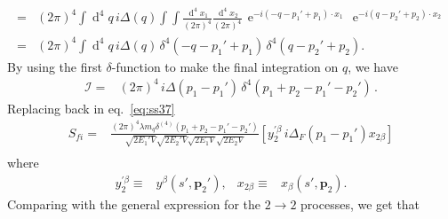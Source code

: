\begin{align}
  =& \left( 2\pi \right)^4 \int {\operatorname{d}^4q}\, i \Delta(q)
\int\int \frac{\operatorname{d}^4x_1}{\left( 2\pi \right)^4} \frac{\operatorname{d}^4x_2}{\left( 2\pi \right)^4} 
\, \operatorname{e}^{-i(-q-p_1'+p_1)\cdot x_1}   
\, \operatorname{e}^{-i(q-p_2'+p_2)\cdot x_2}   \nonumber\\
 =& \left( 2\pi \right)^4 \int {\operatorname{d}^4q}\, i \Delta(q)
\, \delta^{4}(-q-p_1'+p_1)   
\, \delta^4(q-p_2'+p_2).
\end{align}
By using the first  $\delta$-function to make the final integration on $q$, we have
\begin{align}
  \mathcal{I} =& \left( 2\pi \right)^4 \, i \Delta(p_1-p_1')   
\, \delta^4(p_1+p_2-p_1'-p_2') \,.
\end{align}
Replacing back in eq.~\eqref{eq:ss37}
\begin{align}
      S_{fi}
    =&\frac{(2\pi)^4 \lambda m_q \delta^{(4)}\left(p_1+p_2-p_1'-p_2'\right) }{\sqrt{2 E_1'V}\sqrt{2 E_2'V}\sqrt{2 E_1V}\sqrt{2 E_2V}}
 \left[y^{\prime\beta}_2\,i\Delta_F(p_1-p_1')x_{2\beta}\right] \nonumber\\
\end{align}
where
\begin{align}
  y^{\prime\beta}_2\equiv&   y^{\beta}(s',\mathbf{p}_2'), &
  x_{2\beta}\equiv&   x_{\beta}(s',\mathbf{p}_2).                           
\end{align}
Comparing with the general expression for the $2\to 2$ processes, we get that

